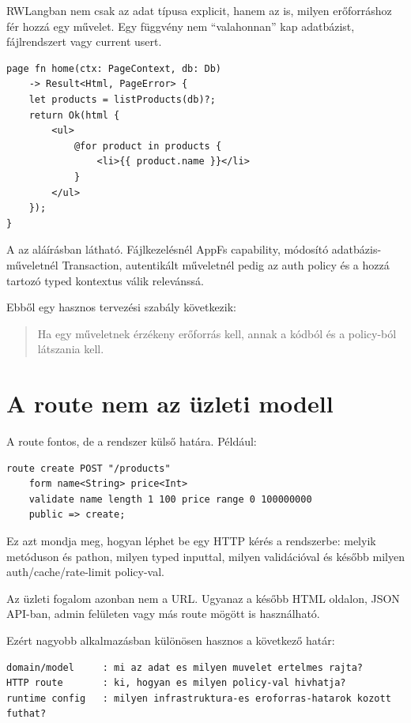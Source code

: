 RWLangban nem csak az adat típusa explicit, hanem az is, milyen erőforráshoz fér hozzá egy művelet. Egy függvény nem ``valahonnan'' kap adatbázist, fájlrendszert vagy current usert.

\begin{lstlisting}[language=RWLang]
page fn home(ctx: PageContext, db: Db)
    -> Result<Html, PageError> {
    let products = listProducts(db)?;
    return Ok(html {
        <ul>
            @for product in products {
                <li>{{ product.name }}</li>
            }
        </ul>
    });
}
\end{lstlisting}

A  az aláírásban látható. Fájlkezelésnél AppFs capability, módosító adatbázis-műveletnél Transaction, autentikált műveletnél pedig az auth policy és a hozzá tartozó typed kontextus válik relevánssá.

Ebből egy hasznos tervezési szabály következik:

\begin{quote}
Ha egy műveletnek érzékeny erőforrás kell, annak a kódból és a policy-ból látszania kell.
\end{quote}

\section{A route nem az üzleti modell}

A route fontos, de a rendszer külső határa. Például:

\begin{lstlisting}[language=RWLang]
route create POST "/products"
    form name<String> price<Int>
    validate name length 1 100 price range 0 100000000
    public => create;
\end{lstlisting}

Ez azt mondja meg, hogyan léphet be egy HTTP kérés a rendszerbe: melyik metóduson és pathon, milyen typed inputtal, milyen validációval és később milyen auth/cache/rate-limit policy-val.

Az üzleti fogalom azonban nem a  URL. Ugyanaz a  később HTML oldalon, JSON API-ban, admin felületen vagy más route mögött is használható.

Ezért nagyobb alkalmazásban különösen hasznos a következő határ:

\begin{lstlisting}
domain/model     : mi az adat es milyen muvelet ertelmes rajta?
HTTP route       : ki, hogyan es milyen policy-val hivhatja?
runtime config   : milyen infrastruktura-es eroforras-hatarok kozott futhat?
\end{lstlisting}

